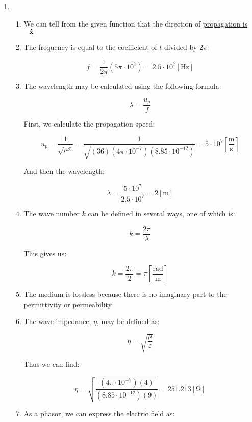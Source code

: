 \begin{enumerate}

  \item

    \begin{enumerate}

      \item We can tell from the given function that the direction of \underline{propagation is $-\bold{\hat{x}}$}

      \item The frequency is equal to the coefficient of $t$ divided by $2\pi$:

        $$\boxed{f=\frac{1}{2\pi}(5\pi\cdot10^7)=2.5\cdot10^7\left[ \si{\hertz} \right]}$$

      \item The wavelength may be calculated using the following formula:

        $$\lambda=\frac{u_p}{f}$$

        First, we calculate the propagation speed:

        $$u_p=\frac{1}{\sqrt{\mu\varepsilon}}=\frac{1}{\sqrt{(36)(4\pi\cdot10^{-7})(8.85\cdot10^{-12})}}=5\cdot10^{7}\left[ \frac{\si{\meter}}{\si{\second}} \right]$$

        And then the wavelength:

        $$\boxed{\lambda=\frac{5\cdot10^7}{2.5\cdot10^7}=2[\si{\meter}]}$$

      \item The wave number $k$ can be defined in several ways, one of which is:

        $$k=\frac{2\pi}{\lambda}$$

        This gives us:

        $$\boxed{k=\frac{2\pi}{2}=\pi\left[ \frac{\text{rad}}{\si{\meter}} \right]}$$

      \item The medium is lossless because there is no imaginary part to the permittivity or permeability

      \item The wave impedance, $\eta$, may be defined as:

        $$\eta=\sqrt{\frac{\mu}{\varepsilon}}$$

        Thus we can find:

        $$\boxed{\eta=\sqrt{\frac{(4\pi\cdot10^{-7})(4)}{(8.85\cdot10^{-12})(9)}}=251.213[\si{\ohm}]}$$

      \item As a phasor, we can express the electric field as:


\end{enumerate}
\end{enumerate}
